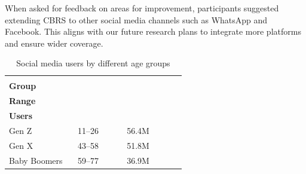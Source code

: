 \documentclass[11pt]{article}
\begin{document}
When asked for feedback on areas for improvement, participants suggested extending CBRS to other social media channels such as WhatsApp and Facebook. This aligns with our future research plans to integrate more platforms and ensure wider coverage. 








\begin{table}[h]
\centering
\caption{Social media users by different age groups}
\small
\begin{tabular}{@{}p{0.35\linewidth}p{0.25\linewidth}p{0.3\linewidth}@{}}
\toprule
\makecell[l]{\textbf{Age}\\\textbf{Group}} & \makecell[l]{\textbf{Age}\\\textbf{Range}} & \makecell[l]{\textbf{Social Media}\\\textbf{Users}} \\ \midrule
Gen Z        & 11--26 & 56.4M \\
Gen X        & 43--58 & 51.8M \\
Baby Boomers & 59--77 & 36.9M \\
\bottomrule
\end{tabular}
\label{tab:zgrp}
\end{table}
\end{document}

